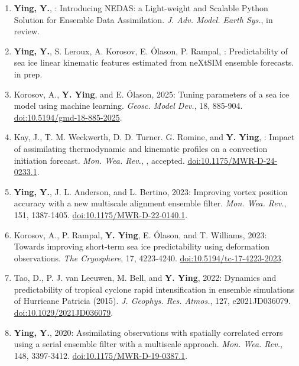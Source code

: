 \begin{enumerate}
\item \textbf{Ying, Y.}, : Introducing NEDAS: a Light-weight and Scalable Python Solution for Ensemble Data Assimilation. 
\textit{J. Adv. Model. Earth Sys.}, in review.

\item \textbf{Ying, Y.}, S. Leroux, A. Korosov, E. Ólason, P. Rampal, : Predictability of sea ice linear kinematic features estimated from neXtSIM ensemble forecasts. 
in prep.

\item Korosov, A., \textbf{Y. Ying}, and E. Ólason, 2025: Tuning parameters of a sea ice model using machine learning. 
\textit{Geosc. Model Dev.}, 18, 885-904. 
\href{https://doi.org/10.5194/gmd-18-885-2025}{doi:10.5194/gmd-18-885-2025}.

\item Kay, J., T. M. Weckwerth, D. D. Turner. G. Romine, and \textbf{Y. Ying}, : Impact of assimilating thermodynamic and kinematic profiles on a convection initiation forecast. 
\textit{Mon. Wea. Rev.}, , accepted. 
\href{https://doi.org/10.1175/MWR-D-24-0233.1}{doi:10.1175/MWR-D-24-0233.1}.

\item \textbf{Ying, Y.}, J. L. Anderson, and L. Bertino, 2023: Improving vortex position accuracy with a new multiscale alignment ensemble filter. 
\textit{Mon. Wea. Rev.}, 151, 1387-1405. 
\href{https://doi.org/10.1175/MWR-D-22-0140.1}{doi:10.1175/MWR-D-22-0140.1}.

\item Korosov, A., P. Rampal, \textbf{Y. Ying}, E. Ólason, and T. Williams, 2023: Towards improving short-term sea ice predictability using deformation observations. 
\textit{The Cryosphere}, 17, 4223-4240. 
\href{https://doi.org/10.5194/tc-17-4223-2023}{doi:10.5194/tc-17-4223-2023}.

\item Tao, D., P. J. van Leeuwen, M. Bell, and \textbf{Y. Ying}, 2022: Dynamics and predictability of tropical cyclone rapid intensification in ensemble simulations of Hurricane Patricia (2015). 
\textit{J. Geophys. Res. Atmos.}, 127, e2021JD036079. 
\href{https://doi.org/10.1029/2021JD036079}{doi:10.1029/2021JD036079}.

\item \textbf{Ying, Y.}, 2020: Assimilating observations with spatially correlated errors using a serial ensemble filter with a multiscale approach. 
\textit{Mon. Wea. Rev.}, 148, 3397-3412. 
\href{https://doi.org/10.1175/MWR-D-19-0387.1}{doi:10.1175/MWR-D-19-0387.1}.


\end{enumerate}
